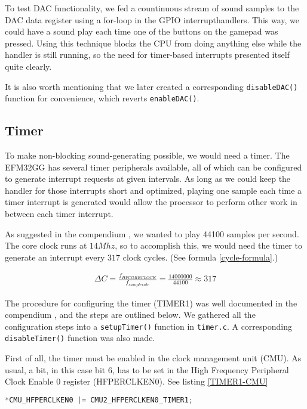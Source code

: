 To test DAC functionality, we fed a countinuous stream of sound samples to the DAC data register using a for-loop in the GPIO interrupthandlers. This way, we could have a sound play each time one of the buttons on the gamepad was pressed. Using this technique blocks the CPU from doing anything else while the handler is still running, so the need for timer-based interrupts presented itself quite clearly.

It is also worth mentioning that we later created a corresponding \texttt{disableDAC()} function for convenience, which reverts \texttt{enableDAC()}.

\subsection{Timer}

To make non-blocking sound-generating possible, we would need a timer. The EFM32GG has several timer peripherals available, all of which can be configured to generate interrupt requests at given intervals. As long as we could keep the handler for those interrupts short and optimized, playing one sample each time a timer interrupt is generated would allow the processor to perform other work in between each timer interrupt.

As suggested in the compendium \cite[p.~42]{compendium}, we wanted to play 44100 samples per second. The core clock runs at $14Mhz$, so to accomplish this, we would need the timer to generate an interrupt every $317$ clock cycles. (See formula \ref{cycle-formula}.)

\begin{gather}
\label{cycle-formula}
\Delta C = \frac{f_{HFCORECLOCK}}{f_{samplerate}} = \frac{14000000}{44100} \approx 317
\end{gather}

The procedure for configuring the timer (TIMER1) was well documented in the compendium \cite[p.~40]{compendium}, and the steps are outlined below. We gathered all the configuration steps into a \texttt{setupTimer()} function in \texttt{timer.c}. A corresponding \texttt{disableTimer()} function was also made.

First of all, the timer must be enabled in the clock management unit (CMU). As usual, a bit, in this case bit 6, has to be set in the High Frequency Peripheral Clock Enable 0 register (HFPERCLKEN0). See listing \ref{TIMER1-CMU}

\begin{lstlisting}[language=C, label=TIMER1-CMU, caption=Enabling the timer in the CMU]
*CMU_HFPERCLKEN0 |= CMU2_HFPERCLKEN0_TIMER1;
\end{lstlisting}

